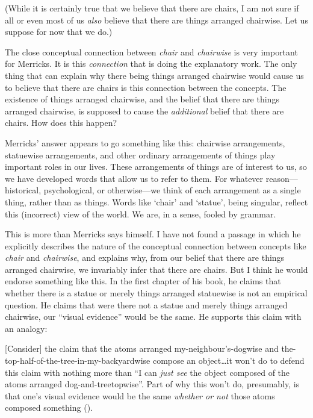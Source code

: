 \documentclass[11pt]{article}
\newenvironment{squote}{%
\begin{spacing}{1}
       	\begin{list}{}{%
\setlength{\labelwidth}{0pt}%
\rightmargin\leftmargin%
}
\item\relax
}{%
\end{list}%
\end{spacing}
}
\begin{document}
\begin{spacing}{1.25}
(While it is certainly true that we believe that there are chairs, I
am not sure if all or even most of us {\em also} believe that there
are things arranged chairwise.  Let us suppose for now that we do.)

The close conceptual connection between {\em chair} and {\em
  chairwise} is very important for Merricks.  It is this {\em
  connection} that is doing the explanatory work.  The only thing that
can explain why there being things arranged chairwise would cause us
to believe that there are chairs is this connection between the
concepts.  The existence of things arranged chairwise, and the belief
that there are things arranged chairwise, is supposed to cause the
{\em additional} belief that there are chairs.  How does this happen?

Merricks' answer appears to go something like this: chairwise
arrangements, statuewise arrangements, and other ordinary arrangements
of things play important roles in our lives.  These arrangements of
things are of interest to us, so we have developed words that allow us
to refer to them.  For whatever reason---historical, psychological, or
otherwise---we think of each arrangement as a single thing, rather
than as things.  Words like `chair' and `statue', being singular,
reflect this (incorrect) view of the world.  We are, in a sense,
fooled by grammar.

This is more than Merricks says himself.  I have not found a passage
in which he explicitly describes the nature of the conceptual
connection between concepts like {\em chair} and {\em chairwise}, and
explains why, from our belief that there are things arranged
chairwise, we invariably infer that there are chairs.  But I think he
would endorse something like this.  In the first chapter of his book,
he claims that whether there is a statue or merely things arranged
statuewise is not an empirical question.  He claims that were there
not a statue and merely things arranged chairwise, our ``visual
evidence'' would be the same.  He supports this claim with an analogy:

\begin{squote}
{[}Consider{]} the claim that the atoms arranged
my-neighbour's-dogwise and the-top-half-of-the-tree-in-my-backyardwise
compose an object\ldots it won't do to defend this claim with nothing
more than ``I can \emph{just see} the object composed of the atoms
arranged dog-and-treetopwise''. Part of why this won't do, presumably,
is that one's visual evidence would be the same \emph{whether or not}
those atoms composed something (\citeyear[8--9]{merricks2001a}).
\end{squote}


\end{spacing}
\end{document}
